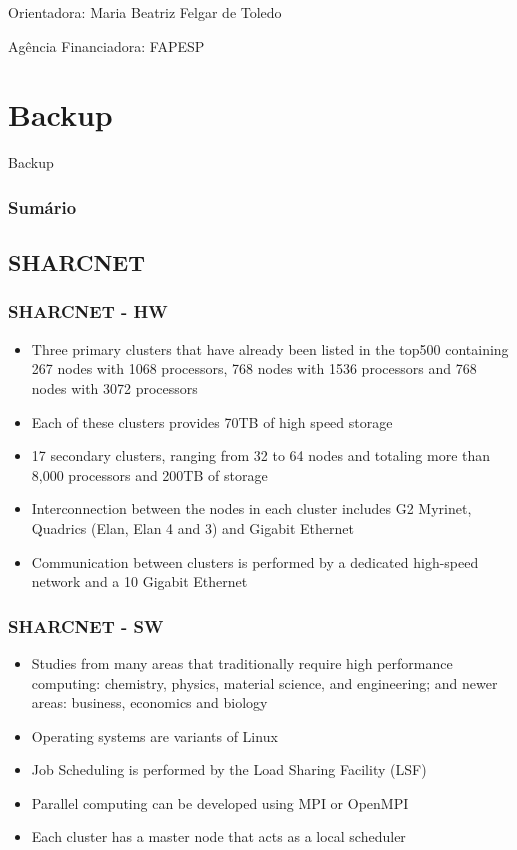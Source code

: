 \documentclass[red, cover=invisible, theme=Warsaw]{myslides}
\begin{document}
\startbackup
\appendix
\begin{frame}
\titlepage
Orientadora: Maria Beatriz Felgar de Toledo

Agência Financiadora: FAPESP
\end{frame}

\section{Backup}
    \begin{frame}
	\begin{center}
	{\Huge Backup}
	\end{center}
    \end{frame}

\begin{frame}\frametitle{Sumário}
\small\tableofcontents
\end{frame}

\subsection{SHARCNET}
\begin{frame}\frametitle{SHARCNET - HW}
  \begin{itemize}
    \item Three primary clusters that have already been listed in the top500 containing 267 nodes with 1068 processors, 768 nodes with 1536 processors and 768 nodes with 3072 processors
    \item Each of these clusters provides 70TB of high speed storage
    \item 17 secondary clusters, ranging from 32 to 64 nodes and totaling more than 8,000 processors and 200TB of storage
    \item Interconnection between the nodes in each cluster includes G2 Myrinet, Quadrics (Elan, Elan 4 and 3) and Gigabit Ethernet
    \item Communication between clusters is performed by a dedicated high-speed network and a 10 Gigabit Ethernet 
  \end{itemize}
\end{frame}

\begin{frame}\frametitle{SHARCNET - SW}
  \begin{itemize}
    \item Studies from many areas that traditionally require high performance computing: chemistry, physics, material science, and engineering;
and newer areas: business, economics and biology
    \item Operating systems are variants of Linux
    \item Job Scheduling is performed by the Load Sharing Facility (LSF)
    \item Parallel computing can be developed using MPI or OpenMPI
    \item Each cluster has a master node that acts as a local scheduler
  \end{itemize}
\end{frame}
\end{document}
